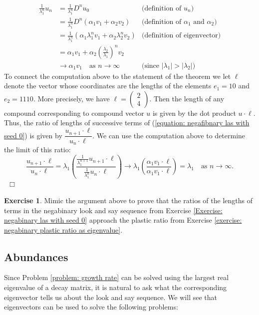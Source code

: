 \documentclass[reqno]{amsart}
\theoremstyle{definition}
\newtheorem{exercise}[theorem]{Exercise}
\begin{document}
\begin{align}\label{key eigenvalue computation start}
    \frac{1}{\lambda_1^n}u_n 
    & = \frac{1}{\lambda_1^n}D^nu_0  & \text{(definition of $u_n$)}\\
    & = \frac{1}{\lambda_1^n}D^n(\alpha_1v_1+\alpha_2v_2) & \text{(definition of $\alpha_1$ and $\alpha_2$)} \\
    & = \frac{1}{\lambda_1^n}(\alpha_1\lambda_1^nv_1+\alpha_2\lambda_2^nv_2) & \text{(definition of eigenvector)}\\
    & = \alpha_1v_1+\alpha_2\left(\frac{\lambda_2}{\lambda_1}\right)^nv_2 \\
    \label{key eigenvalue computation end}
    & \to \alpha_1v_1\quad\text{as }n\to\infty & \text{(since $|\lambda_1|>|\lambda_2|$)}
\end{align}
To connect the computation above to the statement of the theorem we let $\ell$ denote the vector whose coordinates are the lengths of the elements $e_1=10$ and $e_2=1110$. More precisely, we have 
$\ell=
\begin{pmatrix}
    2 \\
    4
\end{pmatrix}$. Then the length of any compound corresponding to compound vector $u$ is given by the dot product $u\cdot\ell$. Thus, the ratio of lengths of successive terms of (\ref{equation: negafibnary las with seed 0}) is given by $\dfrac{u_{n+1}\cdot\ell}{u_n\cdot\ell}$. We can use the computation above to determine the limit of this ratio:
\begin{equation*}
    \dfrac{u_{n+1}\cdot\ell}{u_n\cdot\ell} = \lambda_1\left(\dfrac{\frac{1}{\lambda_1^{n+1}}u_{n+1}\cdot\ell}{\frac{1}{\lambda_1^{n}}u_n\cdot\ell}\right)\to\lambda_1\left(\dfrac{\alpha_1v_1\cdot\ell}{\alpha_1v_1\cdot\ell}\right)=\lambda_1\quad\text{as }n\to\infty.
\end{equation*}
~\hfill$\Box$

\begin{exercise}
    Mimic the argument above to prove that the ratios of the lengths of terms in the negabinary look and say sequence from Exercise \ref{Exercise: negabinary las with seed 0} approach the plastic ratio from Exercise \ref{exercise: negabinary plastic ratio as eigenvalue}.
\end{exercise}

\subsection{Abundances} \label{subsection: abundances}
Since Problem \ref{problem: growth rate} can be solved using the largest real eigenvalue of a decay matrix, it is natural to ask what the corresponding eigenvector tells us about the look and say sequence. We will see that eigenvectors can be used to solve the following problems:
\end{document}
